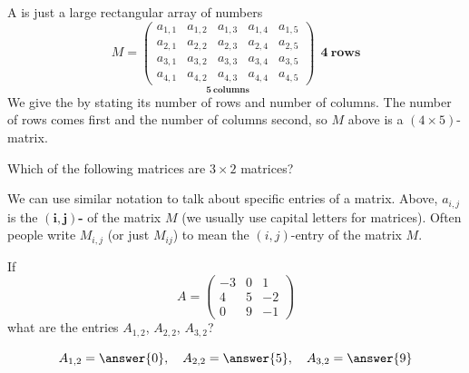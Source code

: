 \documentclass{ximera}
\begin{document}
A  is just a large rectangular array of numbers
\[
M =
\underset{\displaystyle\boldsymbol{5}~\textbf{columns}}{\begin{pmatrix}
  a_{1,1} & a_{1,2} & a_{1,3} & a_{1,4} & a_{1,5} \\
  a_{2,1} & a_{2,2} & a_{2,3} & a_{2,4} & a_{2,5} \\
  a_{3,1} & a_{3,2} & a_{3,3} & a_{3,4} & a_{3,5} \\
  a_{4,1} & a_{4,2} & a_{4,3} & a_{4,4} & a_{4,5}
\end{pmatrix}}
~~\boldsymbol{4}~\textbf{rows}
\]
We give the  by stating its number of rows
and number of columns. The number of rows comes first and the number
of columns second, so $M$ above is a $(4\times 5)$-matrix.
\begin{question}
  Which of the following matrices are $3\times 2$ matrices?
  \begin{selectAll}
  \pdfOnly{\end{multicols}}
  \end{selectAll}
\end{question}


We can use similar notation to talk about specific entries of a
matrix. Above, $a_{i,j}$ is the $\boldsymbol{(i,j)}${\bf-}
of the matrix $M$ (we usually use capital letters for matrices). Often
people write $M_{i,j}$ (or just $M_{ij}$) to mean the $(i,j)$-entry of
the matrix $M$.



\begin{question}
  If
  \[A= \begin{pmatrix}
  -3 & 0 & 1\\
  4 & 5 & -2\\
  0 & 9 & -1
  \end{pmatrix}
  \]
  what are the entries $A_{1,2}$, $A_{2,2}$, $A_{3,2}$?
  \begin{prompt}
    \[
    A_{1,2} = \answer{0}, \quad A_{2,2} = \answer{5}, \quad A_{3,2} = \answer{9}
    \]
  \end{prompt}
\end{question}
\end{document}
